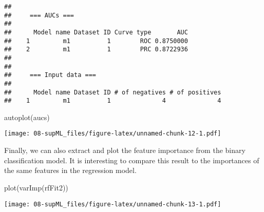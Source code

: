 \documentclass[
  oneside]{book}
\newenvironment{Shaded}{\begin{snugshade}}{\end{snugshade}}
\newcommand{\FunctionTok}[1]{\textcolor[rgb]{0.00,0.00,0.00}{#1}}
\newcommand{\NormalTok}[1]{#1}
\begin{document}
\begin{verbatim}
## 
##     === AUCs ===
## 
##      Model name Dataset ID Curve type       AUC
##    1         m1          1        ROC 0.8750000
##    2         m1          1        PRC 0.8722936
## 
## 
##     === Input data ===
## 
##      Model name Dataset ID # of negatives # of positives
##    1         m1          1              4              4
\end{verbatim}

\begin{Shaded}
\begin{Highlighting}[]
\FunctionTok{autoplot}\NormalTok{(aucs)}
\end{Highlighting}
\end{Shaded}

\texttt{[image: 08-supML\_files/figure-latex/unnamed-chunk-12-1.pdf]}

Finally, we can also extract and plot the feature importance from the binary
classification model. It is interesting to compare this result to the importances
of the same features in the regression model.

\begin{Shaded}
\begin{Highlighting}[]
\FunctionTok{plot}\NormalTok{(}\FunctionTok{varImp}\NormalTok{(rfFit2))}
\end{Highlighting}
\end{Shaded}

\texttt{[image: 08-supML\_files/figure-latex/unnamed-chunk-13-1.pdf]}

  
\end{document}
